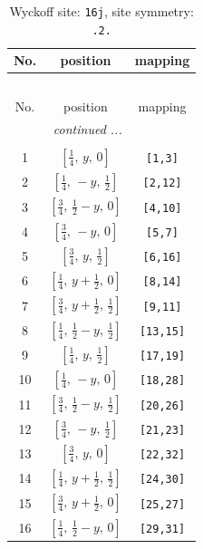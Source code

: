 \documentclass[fleqn,8pt]{jsarticle}
\begin{document}
\renewcommand{\arraystretch}{1.2}
\begin{longtable}{ccc}
\caption{Wyckoff site: {\tt 16j}, site symmetry: {\tt .2.}}
 \\
 \hline \hline
No. & position & mapping \\ \hline \endfirsthead

\multicolumn{2}{l}{\tablename\ \thetable{}} \\
 \hline \hline
No. & position & mapping \\ \hline \endhead

 \hline \hline
\multicolumn{2}{r}{\footnotesize\it continued ...} \\ \endfoot

 \hline \hline
\multicolumn{2}{r}{} \\ \endlastfoot

1 & $\left[ \frac{1}{4},\, y,\, 0 \right]$ & {\tt [1,3]} \\ \hline
2 & $\left[ \frac{1}{4},\, - y,\, \frac{1}{2} \right]$ & {\tt [2,12]} \\ \hline
3 & $\left[ \frac{3}{4},\, \frac{1}{2} - y,\, 0 \right]$ & {\tt [4,10]} \\ \hline
4 & $\left[ \frac{3}{4},\, - y,\, 0 \right]$ & {\tt [5,7]} \\ \hline
5 & $\left[ \frac{3}{4},\, y,\, \frac{1}{2} \right]$ & {\tt [6,16]} \\ \hline
6 & $\left[ \frac{1}{4},\, y + \frac{1}{2},\, 0 \right]$ & {\tt [8,14]} \\ \hline
7 & $\left[ \frac{3}{4},\, y + \frac{1}{2},\, \frac{1}{2} \right]$ & {\tt [9,11]} \\ \hline
8 & $\left[ \frac{1}{4},\, \frac{1}{2} - y,\, \frac{1}{2} \right]$ & {\tt [13,15]} \\ \hline
9 & $\left[ \frac{1}{4},\, y,\, \frac{1}{2} \right]$ & {\tt [17,19]} \\ \hline
10 & $\left[ \frac{1}{4},\, - y,\, 0 \right]$ & {\tt [18,28]} \\ \hline
11 & $\left[ \frac{3}{4},\, \frac{1}{2} - y,\, \frac{1}{2} \right]$ & {\tt [20,26]} \\ \hline
12 & $\left[ \frac{3}{4},\, - y,\, \frac{1}{2} \right]$ & {\tt [21,23]} \\ \hline
13 & $\left[ \frac{3}{4},\, y,\, 0 \right]$ & {\tt [22,32]} \\ \hline
14 & $\left[ \frac{1}{4},\, y + \frac{1}{2},\, \frac{1}{2} \right]$ & {\tt [24,30]} \\ \hline
15 & $\left[ \frac{3}{4},\, y + \frac{1}{2},\, 0 \right]$ & {\tt [25,27]} \\ \hline
16 & $\left[ \frac{1}{4},\, \frac{1}{2} - y,\, 0 \right]$ & {\tt [29,31]} \\
\end{longtable}
\end{document}
